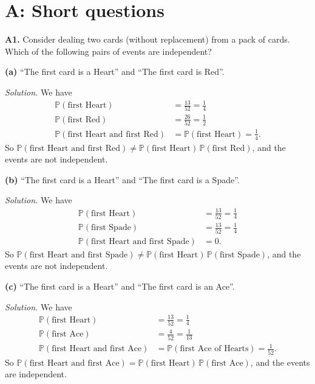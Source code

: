 \documentclass[
  a4paper,
]{book}
\theoremstyle{definition}
\theoremstyle{definition}
\theoremstyle{definition}
\theoremstyle{definition}
\theoremstyle{remark}
\begin{document}
\hypertarget{P3-short}{%
\section*{A: Short questions}\label{P3-short}}

\textbf{A1.} Consider dealing two cards (without replacement) from a pack of cards. Which of the following pairs of events are independent?

\textbf{(a)} ``The first card is a Heart'' and ``The first card is Red''.

\begin{myanswers}
\emph{Solution.}
We have
\begin{align*}
\mathbb P(\text{first Heart}) &= \frac{13}{52} = \frac14 \\
\mathbb P(\text{first Red}) &= \frac{26}{52} = \frac12 \\
\mathbb P(\text{first Heart and first Red}) &= \mathbb P(\text{first Heart}) = \frac14 .
\end{align*}
So \(\mathbb P(\text{first Heart and first Red}) \neq \mathbb P(\text{first Heart})\,\mathbb P(\text{first Red})\), and the events are not independent.

\end{myanswers}

\textbf{(b)} ``The first card is a Heart'' and ``The first card is a Spade''.

\begin{myanswers}
\emph{Solution.}
We have
\begin{align*}
\mathbb P(\text{first Heart}) &= \frac{13}{52} = \frac14 \\
\mathbb P(\text{first Spade}) &= \frac{13}{52} = \frac14 \\
\mathbb P(\text{first Heart and first Spade}) &= 0 .
\end{align*}
So \(\mathbb P(\text{first Heart and first Spade}) \neq \mathbb P(\text{first Heart})\,\mathbb P(\text{first Spade})\), and the events are not independent.

\end{myanswers}

\textbf{(c)} ``The first card is a Heart'' and ``The first card is an Ace''.

\begin{myanswers}
\emph{Solution.}
We have
\begin{align*}
\mathbb P(\text{first Heart}) &= \frac{13}{52} = \frac14 \\
\mathbb P(\text{first Ace}) &= \frac{4}{52} = \frac1{13} \\
\mathbb P(\text{first Heart and first Ace}) &= \mathbb P(\text{first Ace of Hearts}) = \frac1{52} .
\end{align*}
So \(\mathbb P(\text{first Heart and first Ace}) = \mathbb P(\text{first Heart})\,\mathbb P(\text{first Ace})\), and the events are independent.

\end{myanswers}
\end{document}
